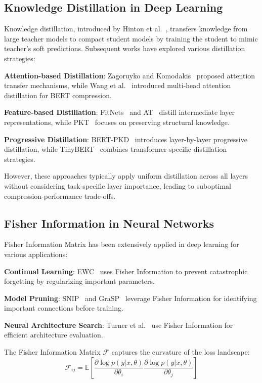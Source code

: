 \documentclass[10pt,conference]{IEEEtran}
\newcommand{\fisher}{\mathcal{F}}
\begin{document}
\subsection{Knowledge Distillation in Deep Learning}

Knowledge distillation, introduced by Hinton et al.~\cite{hinton2015distilling}, transfers knowledge from large teacher models to compact student models by training the student to mimic teacher's soft predictions. Subsequent works have explored various distillation strategies:

\textbf{Attention-based Distillation}: Zagoruyko and Komodakis~\cite{zagoruyko2016attention} proposed attention transfer mechanisms, while Wang et al.~\cite{wang2020minilm} introduced multi-head attention distillation for BERT compression.

\textbf{Feature-based Distillation}: FitNets~\cite{romero2014fitnets} and AT~\cite{zagoruyko2016attention} distill intermediate layer representations, while PKT~\cite{passban2021alp} focuses on preserving structural knowledge.

\textbf{Progressive Distillation}: BERT-PKD~\cite{sun2019patient} introduces layer-by-layer progressive distillation, while TinyBERT~\cite{jiao2019tinybert} combines transformer-specific distillation strategies.

However, these approaches typically apply uniform distillation across all layers without considering task-specific layer importance, leading to suboptimal compression-performance trade-offs.

\subsection{Fisher Information in Neural Networks}

Fisher Information Matrix has been extensively applied in deep learning for various applications:

\textbf{Continual Learning}: EWC~\cite{kirkpatrick2017overcoming} uses Fisher Information to prevent catastrophic forgetting by regularizing important parameters.

\textbf{Model Pruning}: SNIP~\cite{lee2018snip} and GraSP~\cite{wang2020picking} leverage Fisher Information for identifying important connections before training.

\textbf{Neural Architecture Search}: Turner et al.~\cite{turner2019blockwise} use Fisher Information for efficient architecture evaluation.

The Fisher Information Matrix $\fisher$ captures the curvature of the loss landscape:
\begin{equation}
\fisher_{ij} = \mathbb{E}\left[\frac{\partial \log p(y|x,\theta)}{\partial \theta_i} \frac{\partial \log p(y|x,\theta)}{\partial \theta_j}\right]
\end{equation}
\end{document}
